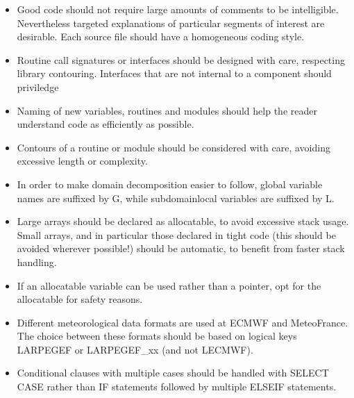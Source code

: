 \documentclass[letterpaper,10pt,english]{sphinxmanual}
\begin{document}
\label{\detokenize{index:guidelines-and-recommendations}}\begin{itemize}
\item {} 
\sphinxAtStartPar
Good code should not require large amounts of comments to be intelligible.
Nevertheless targeted explanations of particular segments of interest are desirable.
Each source file should have a homogeneous coding style.

\item {} 
\sphinxAtStartPar
Routine call signatures or interfaces should be designed with care, respecting library
contouring. Interfaces that are not internal to a component should priviledge

\item {} 
\sphinxAtStartPar
Naming of new variables, routines and modules should help the reader understand code as efficiently
as possible. 

\item {} 
\sphinxAtStartPar
Contours of a routine or module should be considered with care, avoiding excessive length
or complexity.

\item {} 
\sphinxAtStartPar
In order to make domain decomposition easier to follow, global variable names are suffixed by G,
while subdomain\sphinxhyphen{}local variables are suffixed by L.

\item {} 
\sphinxAtStartPar
Large arrays should be declared as allocatable, to avoid excessive stack usage.
Small arrays, and in particular those declared in tight code (this should be avoided wherever
possible!) should be automatic, to benefit from faster stack handling.

\item {} 
\sphinxAtStartPar
If an allocatable variable can be used rather than a pointer, opt for the allocatable for
safety reasons.

\item {} 
\sphinxAtStartPar
Different meteorological data formats are used at ECMWF and Meteo\sphinxhyphen{}France.
The choice between these formats should be based on logical keys LARPEGEF or LARPEGEF\_xx
(and not LECMWF).

\item {} 
\sphinxAtStartPar
Conditional clauses with multiple cases should be handled with SELECT CASE rather than IF
statements followed by multiple ELSEIF statements.


\end{itemize}
\end{document}
